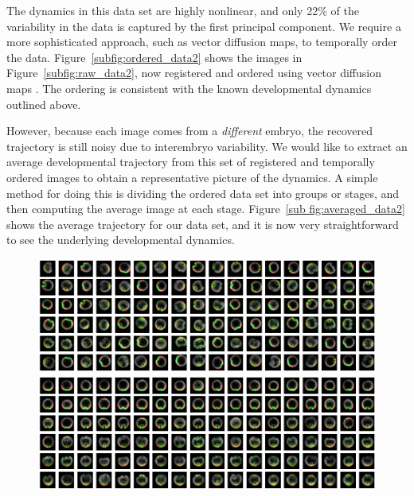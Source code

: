 \documentclass{pnastwo}
\begin{document}
\begin{article}
The dynamics in this data set are highly nonlinear, and only 22\% of the variability in the data is captured by the first principal component.
%
We require a more sophisticated approach, such as vector diffusion maps, to temporally order the data.
%
Figure~\ref{subfig:ordered_data2} shows the images in Figure~\ref{subfig:raw_data2}, now registered and ordered using vector diffusion maps \cite{singer2012vector}.
%
The ordering is consistent with the known developmental dynamics outlined above.

However, because each image comes from a {\it different} embryo, the recovered trajectory is still noisy due to interembryo variability.
%
We would like to extract an average developmental trajectory from this set of registered and temporally ordered images to obtain a representative picture of the dynamics.
%
A simple method for doing this is dividing the ordered data set into groups or stages, and then computing the average image at each stage. 
%
Figure~\ref{sub fig:averaged_data2} shows the average trajectory for our data set, and it is now very straightforward to see the underlying developmental dynamics.

\newpage
\begin{figure}[t]
\includegraphics[width=16.8cm]{raw_data2}

\vspace{0.2cm}
\includegraphics[width=16.8cm]{VDM_ordered}


\end{figure}
\end{article}
\end{document}
